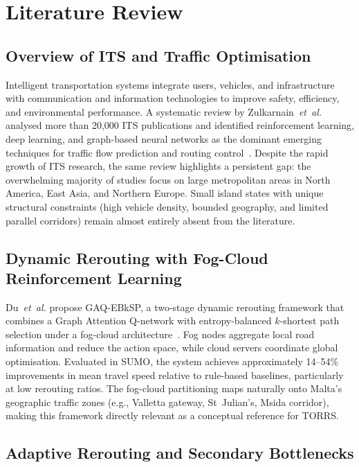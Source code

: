 \documentclass[conference]{IEEEtran}
\begin{document}
\section{Literature Review}

\subsection{Overview of ITS and Traffic Optimisation}

Intelligent transportation systems integrate users, vehicles, and infrastructure
with communication and information technologies to improve safety, efficiency,
and environmental performance. A systematic review by Zulkarnain~\textit{et~al.}
analysed more than 20{,}000 ITS publications and identified reinforcement learning,
deep learning, and graph-based neural networks as the dominant emerging techniques
for traffic flow prediction and routing control~\cite{zulkarnain2021}. Despite
the rapid growth of ITS research, the same review highlights a persistent gap:
the overwhelming majority of studies focus on large metropolitan areas in North
America, East Asia, and Northern Europe. Small island states with unique
structural constraints (high vehicle density, bounded geography, and limited
parallel corridors) remain almost entirely absent from the literature.

\subsection{Dynamic Rerouting with Fog-Cloud Reinforcement Learning}

Du~\textit{et~al.} propose GAQ-EBkSP, a two-stage dynamic rerouting framework
that combines a Graph Attention Q-network with entropy-balanced $k$-shortest path
selection under a fog-cloud architecture~\cite{du2023}. Fog nodes aggregate local
road information and reduce the action space, while cloud servers coordinate
global optimisation. Evaluated in SUMO, the system achieves approximately
14--54\% improvements in mean travel speed relative to rule-based baselines,
particularly at low rerouting ratios. The fog-cloud partitioning maps naturally
onto Malta's geographic traffic zones (e.g., Valletta gateway, St~Julian's,
Msida corridor), making this framework directly relevant as a conceptual
reference for TORRS.

\subsection{Adaptive Rerouting and Secondary Bottlenecks}
\end{document}
